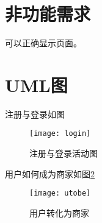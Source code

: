 \section{非功能需求}
可以正确显示页面。

\section{UML图}
注册与登录如图
\begin{figure}[htbp]
    \centering
    \texttt{[image: login]}
    \caption{注册与登录活动图}\label{fig:ds}
\end{figure}

用户如何成为商家如图\ref{fig:dd}
\begin{figure}[htbp]
    \centering
    \texttt{[image: utobe]}
    \caption{用户转化为商家}\label{fig:dd}
\end{figure}
